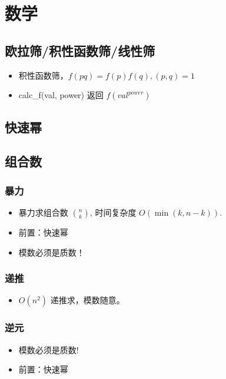 \section{数学}
\subsection{欧拉筛/积性函数筛/线性筛}
\begin{itemize}
    \item 积性函数筛，$f(pq)=f(p)f(q),(p,q)=1$
    \item calc\_f(val, power) 返回 $f(val^{power})$
\end{itemize}

\subsection{快速幂}


\subsection{组合数}
\subsubsection{暴力}
\begin{itemize}
    \item 暴力求组合数 $\binom{n}{k}$, 时间复杂度 $O(\min(k, n - k))$.
    \item 前置：快速幂
    \item 模数必须是质数！
\end{itemize}

\subsubsection{递推}
\begin{itemize}
    \item $O(n^2)$ 递推求，模数随意。
\end{itemize}

\subsubsection{逆元}
\begin{itemize}
    \item 模数必须是质数!
    \item 前置：快速幂
\end{itemize}

